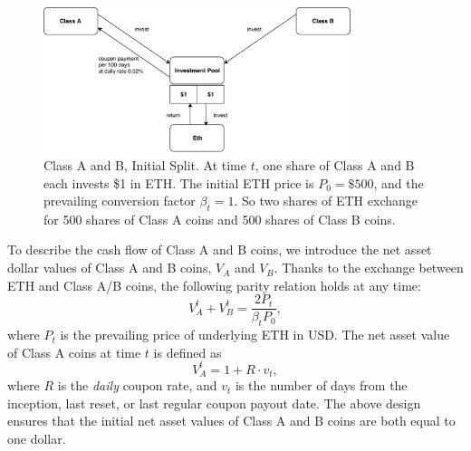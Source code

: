 \documentclass[draft, noinfoline]{ectaart}
\numberwithin{equation}{section}
\theoremstyle{plain}
\begin{document}
\begin{figure}[!htb]
	\centering
	\includegraphics[width=0.8\textwidth]{initial}
	\caption{Class A and B, Initial Split. At time $t$, one share of Class A and B each invests \$1 in ETH. The initial ETH price is $P_0=\$500$, and the prevailing conversion factor $\beta_t=1$. So two shares of ETH exchange for 500 shares of Class A coins and 500 shares of Class B coins.}\label{fig:initial}
\end{figure}

To describe the cash flow of Class A and B coins, we introduce the net asset dollar values of Class A and B coins, $V_A$ and $V_B$. Thanks to the exchange between ETH and Class A/B coins, the following parity relation holds at any time:
\begin{equation}
\label{parity}
V_{A}^{t}+V_{B}^{t}=\frac{2P_{t}}{\beta_tP_{0}},
\end{equation}
where $P_t$ is the prevailing price of underlying ETH in USD.
The net asset value of Class A coins at time $t$ is defined as
\begin{equation}
V_{A}^{t}= 1+R\cdot v_t, \label{eq:netvalue}
\end{equation}
where $R$ is the \emph{daily} coupon rate, and $v_t$ is the number of days from the inception, last reset, or last regular coupon payout date. The above design ensures that the initial net asset values of Class A and B coins are both equal to one dollar.
\end{document}
